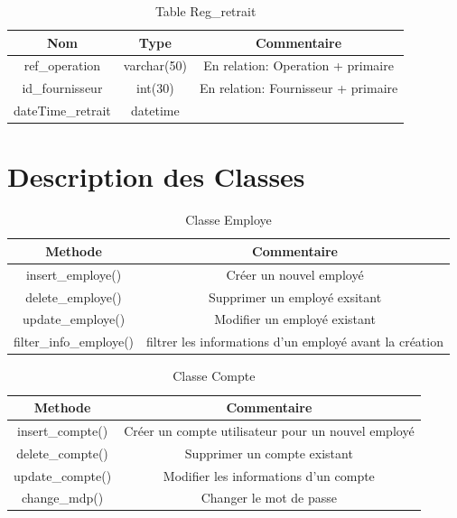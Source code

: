 \documentclass{report}
\begin{document}
\begin{table}[t!]
    \begin{center}
        \begin{tabular}{|c|c|c|}
            \hline
            \textbf{Nom} & \textbf{Type} & \textbf{Commentaire}  \\
            \hline
            ref\_operation & varchar(50) & En relation: Operation + primaire  \\
            \hline
            id\_fournisseur & int(30) & En relation: Fournisseur + primaire \\
            \hline
            dateTime\_retrait & datetime &  \\
            \hline
        \end{tabular}
    \end{center}
\caption{Table Reg\_retrait}
\end{table}

\chapter{Description des Classes}
\label{a2}
\begin{table}[h!]
    \begin{center}
        \begin{tabular}{|c|c|}
            \hline
            \textbf{Methode} & \textbf{Commentaire}  \\
            \hline
            insert\_employe() & Créer un nouvel employé\\
            \hline
            delete\_employe()  & Supprimer un employé exsitant\\
            \hline
            update\_employe()  & Modifier un employé existant\\
            \hline
            filter\_info\_employe() & filtrer les informations d'un employé avant la création\\
            \hline
        \end{tabular}
    \end{center}
\caption{Classe Employe}
\end{table}

\begin{table}[h!]
    \begin{center}
        \begin{tabular}{|c|c|}
            \hline
            \textbf{Methode} & \textbf{Commentaire}  \\
            \hline
            insert\_compte() & Créer un compte utilisateur pour un nouvel employé\\
            \hline
            delete\_compte()  & Supprimer un compte existant\\
            \hline
            update\_compte()  & Modifier les informations d'un compte\\
            \hline
            change\_mdp() & Changer le mot de passe\\
            \hline
        \end{tabular}
    \end{center}
\caption{Classe Compte}
\end{table}
\end{document}
